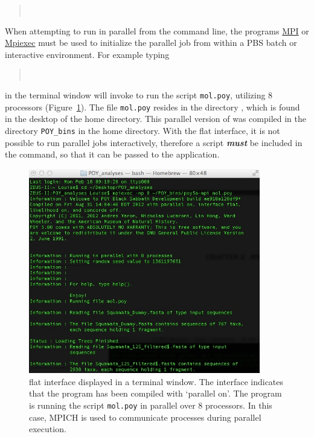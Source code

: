 \begin{quote}
\\
\end{quote}

When attempting to run \poy in parallel from the command line, the programs \href{http://www-unix.mcs.anl.gov/mpi/}{MPI} 
or \href {https://www.osc.edu/~djohnson/mpiexec/} {Mpiexec} must be used to initialize the parallel job 
from within a PBS batch or interactive environment.  For example typing

\begin{quote}
\\
\end{quote}
in the terminal window will invoke \poy to run the script \texttt{mol.poy}, utilizing 8 processors 
(Figure~\ref{fig:mpiexecscript}).  The file \texttt{mol.poy} resides in the directory , 
which is found in the desktop of the home directory.
This parallel version of \poy was compiled in the directory 
\texttt{POY\_bins} in the home directory.  With the flat interface, it is not possible to run parallel jobs
interactively, therefore a script \textbf {\emph{must}} be included in the command, so that it can 
be passed to the application.  

\begin{figure}
    \begin{center}
        \includegraphics[width=0.9\textwidth]{doc/figures/mpiexec_script.jpg}
    \end{center}
    \caption{\poy flat interface displayed in a terminal window. The interface indicates that the program 
    has been compiled with `parallel on'. The program is running the script \texttt{mol.poy} in parallel 
    over 8 processors. In this case, MPICH is used to communicate processes during  parallel execution.}
    \label{fig:mpiexecscript}
\end{figure}

